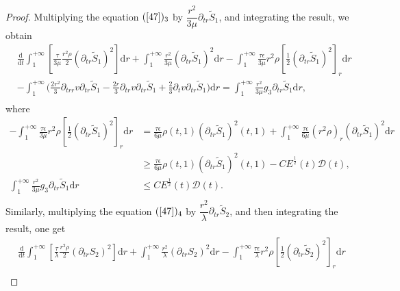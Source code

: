 \documentclass[10pt,reqno]{amsart}
\numberwithin{equation}{section}
\begin{document}
\begin{proof}
		Multiplying the equation $(\ref{47})_3$  by  $\dfrac{r^2}{3\mu}\partial_{tr} \tilde{S}_1$, and  integrating the result, we obtain
		\begin{equation}\label{50}
			\begin{aligned}
				&\frac{\mathrm{d}}{\mathrm{d} t}\int_{1}^{+\infty}\left[\frac{\tau}{3 \mu} \frac{r^2 \rho}{2}(\partial_{tr}\tilde{S}_1)^2\right]\mathrm{d}r
				+\int_{1}^{+\infty}\frac{r^2}{3 \mu}(\partial_{tr}\tilde{S}_1)^2 \mathrm{d}r
				-\int_{1}^{+\infty}
				\frac{\tau\epsilon}{3 \mu}r^2\rho[\frac{1}{2}(\partial_{tr}\tilde{S}_1)^2]_r\mathrm{d}r\\
				&-\int_{1}^{+\infty}\bigg(\frac{2r^2}{3}\partial_{trr}v\partial_{tr}\tilde{S}_1-\frac{2r}{3}\partial_{tr}v\partial_{tr}\tilde{S}_1
				+\frac{2}{3}\partial_{t}v\partial_{tr}\tilde{S}_1\bigg)\mathrm{d}r
				=\int_{1}^{+\infty}\frac{r^2}{3\mu}g_3\partial_{tr} \tilde{S}_1\mathrm{d}r,\\
			\end{aligned}
		\end{equation}
		where
		\begin{equation}\nonumber
			\begin{aligned}
				-\int_{1}^{+\infty}
				\frac{\tau\epsilon}{3 \mu}r^2\rho[\frac{1}{2}(\partial_{tr}\tilde{S}_1)^2]_r\mathrm{d}r
				&=\frac{\tau\epsilon}{6\mu}\rho(t,1)(\partial_{tr}\tilde{S}_1)^2(t,1)
				+\int_{1}^{+\infty}
				\frac{\tau\epsilon}{6\mu}(r^2\rho)_r(\partial_{tr}\tilde{S}_1)^2\mathrm{d}r\\
				&\geq\frac{\tau\epsilon}{6\mu}\rho(t,1)(\partial_{tr}\tilde{S}_1)^2(t,1) -C E^{\frac{1}{2}}(t) \mathcal{D}(t),\\
				\int_{1}^{+\infty}\frac{r^2}{3\mu}g_3\partial_{tr} \tilde{S}_1\mathrm{d}r
				&\leq C E^{\frac{1}{2}}(t) \mathcal{D}(t).\\
			\end{aligned}
		\end{equation}
		Similarly, multiplying the equation $(\ref{47})_4$ by  $\dfrac{r^2}{\lambda}\partial_{tr} \tilde{S}_2$, and then integrating the result, one get 
		\begin{equation}
			\begin{aligned}\label{51}
				&\frac{\mathrm{d}}{\mathrm{d} t}\int_{1}^{+\infty}\left[\frac{\tau }{\lambda} \frac{r^2 \rho}{2}(\partial_{tr}{S_2})^2\right]\mathrm{d}r
				+\int_{1}^{+\infty}\frac{r^2}{\lambda}(\partial_{tr}{S_2})^2
				\mathrm{d}r
				-\int_{1}^{+\infty}
				\frac{\tau \epsilon}{\lambda}r^2\rho[\frac{1}{2}(\partial_{tr}\tilde{S}_2)^2]_r\mathrm{d}r\\

\end{aligned}
\end{equation}
\end{proof}
\end{document}
